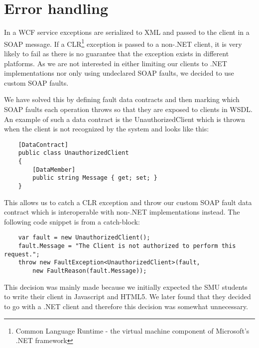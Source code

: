 \documentclass[../report.tex]{subfiles}
\begin{document}
\section{Error handling}
In a WCF service exceptions are serialized to XML and passed to the client in a SOAP message. If a CLR\footnote{Common Language Runtime - the virtual machine component of Microsoft's .NET framework} exception is passed to a non-.NET client, it is very likely to fail as there is no guarantee that the exception exists in different platforms. As we are not interested in either limiting our clients to .NET implementations nor only using undeclared SOAP faults, we decided to use custom SOAP faults. 

We have solved this by defining fault data contracts and then marking which SOAP faults each operation throws so that they are exposed to clients in WSDL. An example of such a data contract is the UnauthorizedClient which is thrown when the client is not recognized by the system and looks like this:

\begin{lstlisting}
    [DataContract]
    public class UnauthorizedClient
    {
        [DataMember]
        public string Message { get; set; }
    }
\end{lstlisting}

This allows us to catch a CLR exception and throw our custom SOAP fault data contract which is interoperable with non-.NET implementations instead. The following code snippet is from a catch-block:

\begin{lstlisting}
    var fault = new UnauthorizedClient();
    fault.Message = "The Client is not authorized to perform this request.";
    throw new FaultException<UnauthorizedClient>(fault, 
        new FaultReason(fault.Message));
\end{lstlisting}

This decision was mainly made because we initially expected the SMU students to write their client in Javascript and HTML5. We later found that they decided to go with a .NET client and therefore this decision was somewhat unnecessary. 
\end{document}
